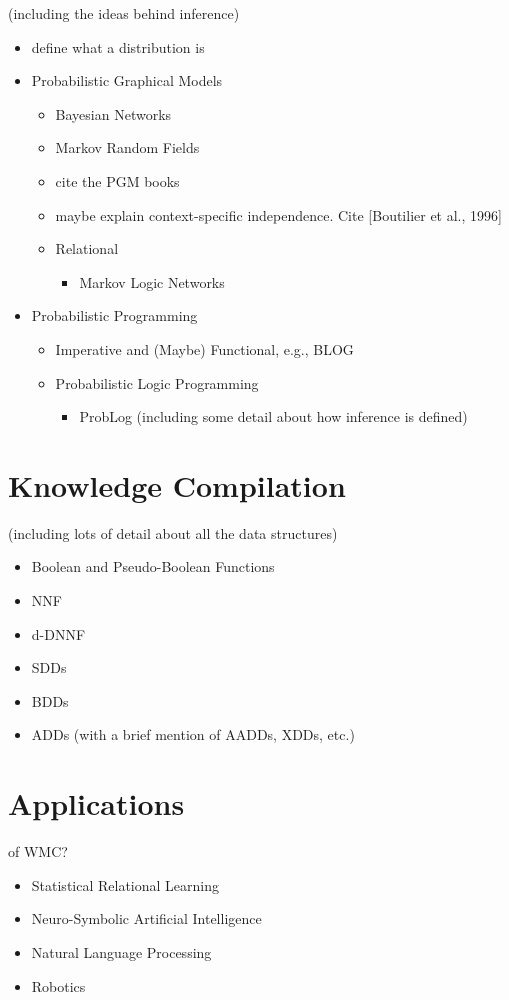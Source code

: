 (including the ideas behind inference)
\begin{itemize}
\item define what a distribution is
\item Probabilistic Graphical Models
  \begin{itemize}
  \item Bayesian Networks
  \item Markov Random Fields
  \item cite the PGM books
  \item maybe explain context-specific independence. Cite [Boutilier et al., 1996]
  \item Relational
    \begin{itemize}
    \item Markov Logic Networks
    \end{itemize}
  \end{itemize}
\item Probabilistic Programming
  \begin{itemize}
  \item Imperative and (Maybe) Functional, e.g., BLOG
  \item Probabilistic Logic Programming
    \begin{itemize}
    \item ProbLog (including some detail about how inference is defined)
    \end{itemize}
  \end{itemize}
\end{itemize}

\section{Knowledge Compilation} \label{sec:kc}

(including lots of detail about all the data structures)
\begin{itemize}
\item Boolean and Pseudo-Boolean Functions
\item NNF
\item d-DNNF
\item SDDs
\item BDDs
\item ADDs (with a brief mention of AADDs, XDDs, etc.)
\end{itemize}

\section{Applications}

of WMC?

\begin{itemize}
\item Statistical Relational Learning
\item Neuro-Symbolic Artificial Intelligence
\item Natural Language Processing
\item Robotics
\end{itemize}
